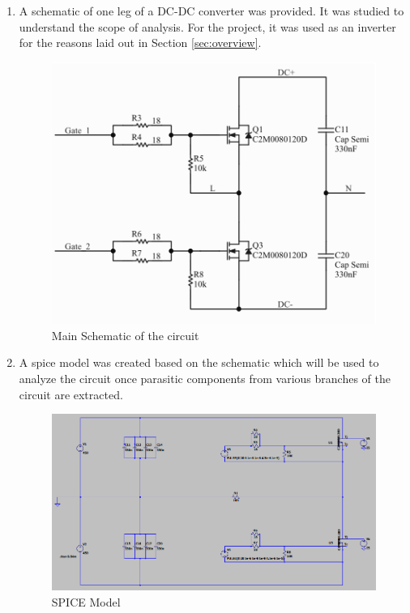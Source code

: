 \begin{enumerate}
\item A schematic of one leg of a DC-DC converter was provided. It was studied to understand the scope of analysis. For the project, it was used as an inverter for the reasons laid out in Section \ref{sec:overview}.


\begin{figure} [H]
  \centering
  \includegraphics[width=\linewidth]{pictures/examples/main_schematic}
  \caption{Main Schematic of the circuit}
  \label{fig:main_schematic}
\end{figure}

\item A spice model was created based on the schematic which will be used to analyze the circuit once parasitic components from various branches of the circuit are extracted.

\begin{figure} [H]
  \centering
  \includegraphics[width=\linewidth]{pictures/examples/spice.png}
  \caption{SPICE Model}
  \label{fig:main_spice}
\end{figure}


\end{enumerate}
